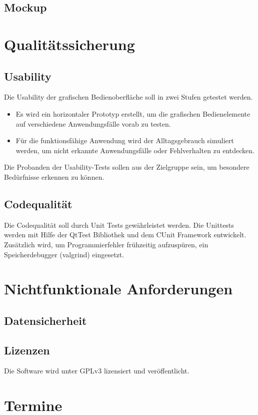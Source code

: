 \documentclass[a4paper,10pt]{article}
\begin{document}
\subsection{Mockup}

\section{Qualitätssicherung}
\subsection{Usability}
Die Usability der grafischen Bedienoberfläche soll in zwei Stufen getestet werden.
\begin{itemize}
\item Es wird ein horizontaler Prototyp erstellt,  um die grafischen Bedienelemente auf verschiedene Anwendungsfälle vorab zu testen. 
\item Für die funktionsfähige Anwendung wird der Alltagsgebrauch simuliert werden, um nicht erkannte Anwendungsfälle oder Fehlverhalten zu entdecken.
\end{itemize}
Die Probanden der Usability-Tests sollen aus der Zielgruppe sein, um besondere Bedürfnisse erkennen zu können.    
\subsection{Codequalität}
Die Codequalität soll durch Unit Tests gewährleistet werden.
Die Unittests werden mit Hilfe der QtTest Bibliothek und dem CUnit Framework entwickelt.
Zusätzlich wird, um Programmierfehler frühzeitig aufzuspüren, ein Speicherdebugger (valgrind) eingesetzt.

\section{Nichtfunktionale Anforderungen}
\subsection{Datensicherheit}
\subsection{Lizenzen}
Die Software wird unter GPLv3 lizensiert und veröffentlicht.
\section{Termine}
\end{document}
